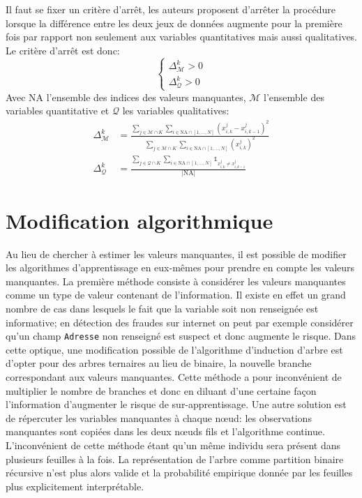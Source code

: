 Il faut se fixer un critère d'arrêt, les auteurs proposent d'arrêter la procédure lorsque la différence entre les deux jeux de données augmente pour la première fois par rapport non seulement aux variables quantitatives mais aussi qualitatives. Le critère d'arrêt est donc:
\begin{equation*}
    \begin{cases}
        \Delta_\mathcal{M}^k > 0 \\
        \Delta_\mathcal{Q}^k > 0
    \end{cases}
\end{equation*}
Avec $\mathrm{NA}$ l'ensemble des indices des valeurs manquantes, $\mathcal{M}$ l'ensemble des variables quantitative et $\mathcal{Q}$ les variables qualitatives:
\begin{align*}
    \Delta_\mathcal{M}^k &= \frac{\sum_{j \in \mathcal{M} \cap K} \sum_{i \in \mathrm{NA} \cap [1,\dotsc,N]} (x^j_{i,k} - x^j_{i,k-1})^2 }{\sum_{j \in \mathcal{M} \cap K} \sum_{i \in \mathrm{NA} \cap [1,\dotsc,N]} (x^j_{i,k})^2} \\
    \Delta_\mathcal{Q}^k &= \frac{\sum_{j \in \mathcal{Q} \cap K} \sum_{i \in \mathrm{NA} \cap [1,\dotsc,N]} \mathds{1}_{x^j_{i,k} \neq x^j_{i,k-1}} }{\vert \mathrm{NA} \vert}
\end{align*}

\section{Modification algorithmique}

Au lieu de chercher à estimer les valeurs manquantes, il est possible de modifier les algorithmes d'apprentissage en eux-mêmes pour prendre en compte les valeurs manquantes.
La première méthode consiste à considérer les valeurs manquantes comme un type de valeur contenant de l'information. Il existe en effet un grand nombre de cas dans lesquels le fait que la variable soit non renseignée est informative; en détection des fraudes sur internet on peut par exemple considérer qu'un champ \texttt{Adresse} non renseigné est suspect et donc augmente le risque. Dans cette optique, une modification possible de l'algorithme d'induction d'arbre est d'opter pour des arbres ternaires au lieu de binaire, la nouvelle branche correspondant aux valeurs manquantes. Cette méthode a pour inconvénient de multiplier le nombre de branches et donc en diluant d'une certaine façon l'information d'augmenter le risque de sur-apprentissage.
Une autre solution est de répercuter les variables manquantes à chaque nœud: les observations manquantes sont copiées dans les deux nœuds fils et l'algorithme continue. L'inconvénient de cette méthode étant qu'un même individu sera présent dans plusieurs feuilles à la fois. La représentation de l'arbre comme partition binaire récursive n'est plus alors valide et la probabilité empirique donnée par les feuilles plus explicitement interprétable.
